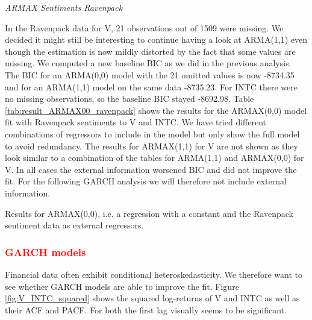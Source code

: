 \textit{ARMAX Sentiments Ravenpack}

In the Ravenpack data for V, 21 observations out of 1509 were missing. We decided it might still be interesting to continue having a look at ARMA(1,1) even though the estimation is now mildly distorted by the fact that some values are missing. We computed a new baseline BIC as we did in the previous analysis. The BIC for an ARMA(0,0) model with the 21 omitted values is now -8734.35 and for an ARMA(1,1) model on the same data -8735.23. For INTC there were no missing observations, so the baseline BIC stayed -8692.98. Table \ref{tab:result_ARMAX00_ravenpack} shows the results for the ARMAX(0,0) model fit with Ravenpack sentiments to V and INTC. We have tried different combinations of regressors to include in the model but only show the full model to avoid redundancy. The results for ARMAX(1,1) for V are not shown as they look similar to a combination of the tables for ARMA(1,1) and ARMAX(0,0) for V. In all cases the external information worsened BIC and did not improve the fit. For the following GARCH analysis we will therefore not include external information. 

\begin{table}[h!]
    \centering
    \vspace{-2ex}
    \small
    

    \vspace{-2ex}
    \small
    
    \caption{Results for ARMAX(0,0), i.e. a regression with a constant and the Ravenpack sentiment data as external regressors.}
    \label{tab:INTC_result_ARMAX00_ravenpack}
\end{table}{}

\subsubsection{\textcolor{red}{GARCH models}}
Financial data often exhibit conditional heteroskedasticity. We therefore want to see whether GARCH models are able to improve the fit. Figure \ref{fig:V_INTC_squared} shows the squared log-returns of V and INTC as well as their ACF and PACF. For both the first lag visually seems to be significant. 

